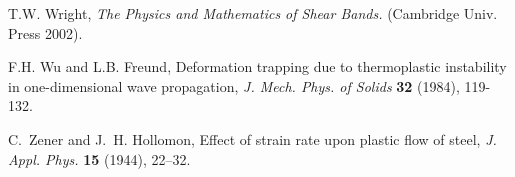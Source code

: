 \documentclass[a4paper,11pt]{article}
\theoremstyle{remark}
\begin{document}
\begin{thebibliography}{10}
%
%
{\sc T.W. Wright},
{\it The Physics and Mathematics of Shear Bands.} (Cambridge Univ. Press 2002).
%

{\sc F.H. Wu and L.B. Freund},
Deformation trapping due to thermoplastic instability in one-dimensional wave propagation,
{\it J. Mech. Phys. of Solids} {\bf  32} (1984), 119-132.

{\sc C.~Zener and J.~H. Hollomon},
Effect of strain rate upon plastic flow of steel,
{\it J. Appl. Phys.}
{\bf 15} (1944), 22--32.

\end{thebibliography}
\end{document}

